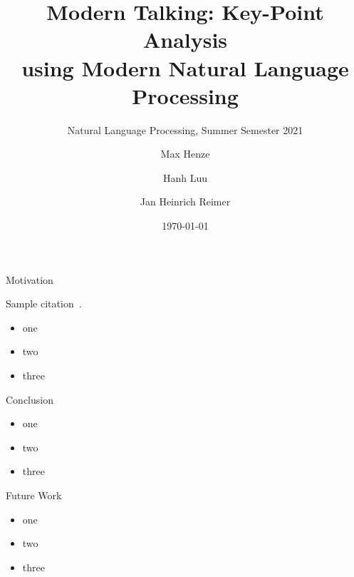 \documentclass[english,handout]{mlutalk}
\title{%
  Modern Talking: Key-Point Analysis \\
  using Modern Natural Language Processing
}
\subtitle{Natural Language Processing, Summer Semester 2021}
\author{Max Henze \and Hanh Luu \and Jan Heinrich Reimer}
\institute{Martin Luther University Halle-Wittenberg}
\date{\today}
\begin{document}
\titleframe

\begin{frame}{Motivation}
  \begin{example}
    Sample citation~\cite{Bar-HaimEFKLS2020}.
  \end{example}
  \begin{itemize}
    \item one
    \item two
    \item three
  \end{itemize}
\end{frame}

\begin{frame}{Conclusion}
  \begin{itemize}
    \item one
    \item two
    \item three
  \end{itemize}
\end{frame}

\begin{frame}{Future Work}
  \begin{itemize}
    \item one
    \item two
    \item three
  \end{itemize}
  \thankyou
\end{frame}

\appendix
\section{\appendixname}

\bibliographyframe
\end{document}
